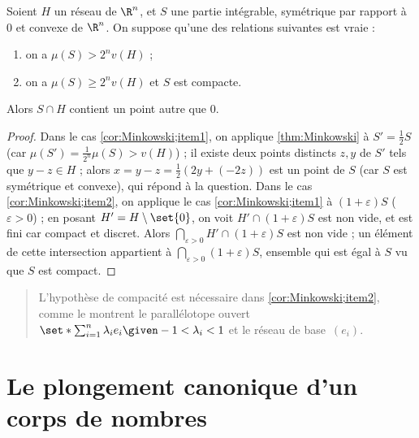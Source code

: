 \documentclass[11pt, %
  title in boldface,
  theorem in new line,
  theorem numbering = section,
  number theorems separately,
  simple name,
]{beaulivre}
\begin{document}
    \begin{corollary}\label{cor:Minkowski}
        Soient \( H \) un réseau de \( \R^n \), et \( S \) une partie intégrable, symétrique par rapport à \( 0 \) et convexe de \( \R^n \). On suppose qu'une des relations suivantes est vraie :
        \begin{enumerate}
            \item \label{cor:Minkowski;item1} on a \( \mu(S) > 2^n v(H) \) ;
            \item \label{cor:Minkowski;item2} on a \( \mu(S) \geqslant 2^n v(H) \) et \( S \) est compacte.
        \end{enumerate}
        Alors \( S \cap H \) contient un point autre que \( 0 \).
    \end{corollary}
    \begin{proof}
        Dans le cas \ref{cor:Minkowski;item1}, on applique \cref{thm:Minkowski} à \( S' = \frac{1}{2} S \) (car \( \mu(S') = \frac{1}{2^n} \mu(S) > v(H) \)) ; il existe deux points distincts \( z, y \) de \( S' \) tels que \( y-z \in H \) ; alors \( x = y-z = \frac{1}{2}(2y+(-2z)) \) est un point de \( S \) (car \( S \) est symétrique et convexe), qui répond à la question. Dans le cas \ref{cor:Minkowski;item2}, on applique le cas \ref{cor:Minkowski;item1} à \( (1+\varepsilon)S \) (\( \varepsilon > 0 \)) ; en posant \( H' = H \setminus \set{0} \), on voit \( H' \cap (1+\varepsilon)S \) est non vide, et est fini car compact et discret. Alors \( \bigcap_{\varepsilon>0} H' \cap (1+\varepsilon)S \) est non vide ; un élément de cette intersection appartient à \( \bigcap_{\varepsilon>0} (1+\varepsilon)S \), ensemble qui est égal à \( S \) vu que \( S \) est compact.
    \end{proof}

    \begin{quote}
        L'hypothèse de compacité est nécessaire dans \ref{cor:Minkowski;item2}, comme le montrent le parallélotope ouvert \( \set*{ \sum_{i=1}^n \lambda_i e_i \given -1 < \lambda_i < 1 } \) et le réseau de base~\( (e_i) \).
    \end{quote}

\section{Le plongement canonique d'un corps de nombres}\label{sec:le plongement canonique d'un corps de nombres}
\end{document}
